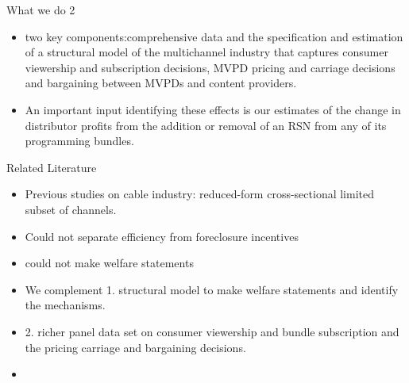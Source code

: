 \documentclass[10pt]{beamer}
\begin{document}
\begin{frame}{What we do 2}
    \begin{itemize}
        \item two key components:comprehensive data and the specification and estimation of a structural model of the multichannel industry that captures consumer viewership and subscription decisions, MVPD pricing and carriage decisions and bargaining between MVPDs and content providers.
        \item An important input identifying these effects is our estimates of the change in distributor profits from the addition or removal of an RSN from any of its programming bundles.
        
    \end{itemize}
\end{frame}
\begin{frame}{Related Literature}
    \begin{itemize}
        \item Previous studies on cable industry: reduced-form cross-sectional limited subset of channels.
        \item Could not separate efficiency from foreclosure incentives
        \item could not make welfare statements
        \item We complement 1. structural model to make welfare statements and identify the mechanisms.
        \item 2. richer panel data set on consumer viewership and bundle subscription and the pricing carriage and bargaining decisions. 
        \item 
    \end{itemize}
    
\end{frame}
\end{document}
